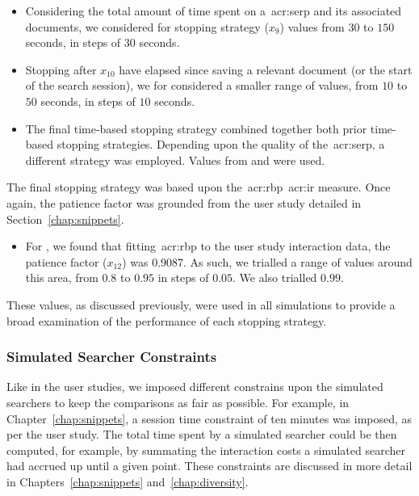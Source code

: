 \begin{itemize}
    \item{Considering the total amount of time spent on a~\gls{acr:serp} and its associated documents, we considered for stopping strategy  ($x_9$) values from $30$ to $150$ seconds, in steps of $30$ seconds.}
    
    \item{Stopping after $x_{10}$ have elapsed since saving a relevant document (or the start of the search session), we for  considered a smaller range of values, from $10$ to $50$ seconds, in steps of $10$ seconds.}
    
    \item{The final time-based stopping strategy  combined together both prior time-based stopping strategies. Depending upon the quality of the~\gls{acr:serp}, a different strategy was employed. Values from  and  were used. }
    
\end{itemize}

The final stopping strategy was based upon the~\gls{acr:rbp}~\gls{acr:ir} measure. Once again, the patience factor was grounded from the user study detailed in Section~\ref{chap:snippets}.

\begin{itemize}
    
    \item{For , we found that fitting~\gls{acr:rbp} to the user study interaction data, the patience factor ($x_{12}$) was 0.9087. As such, we trialled a range of values around this area, from $0.8$ to $0.95$ in steps of $0.05$. We also trialled $0.99$.}
    
\end{itemize}

These values, as discussed previously, were used in all simulations to provide a broad examination of the performance of each stopping strategy.

\subsubsection{Simulated Searcher Constraints}
Like in the user studies, we imposed different constrains upon the simulated searchers to keep the comparisons as fair as possible. For example, in Chapter~\ref{chap:snippets}, a session time constraint of ten minutes was imposed, as per the user study. The total time spent by a simulated searcher could be then computed, for example, by summating the interaction costs a simulated searcher had accrued up until a given point. These constraints are discussed in more detail in Chapters~\ref{chap:snippets} and~\ref{chap:diversity}.


